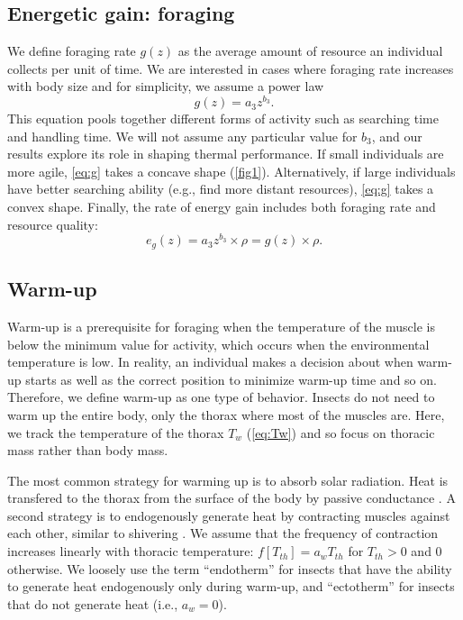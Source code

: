 \subsection*{Energetic gain: foraging}
We define foraging rate $g(z)$ as the average amount of resource an individual collects per unit of time.
We are interested in cases where foraging rate increases with body size and for simplicity, we assume a power law  %
\begin{equation} \label{eq:g}
	g(z) = a_3 z^{b_3}.
\end{equation}
This equation pools together different forms of activity such as searching time and handling time. %
We will not assume any particular value for $b_3$, and our results explore its role in shaping thermal performance.
If small individuals are more agile, \cref{eq:g} takes a concave shape (\cref{fig1}).
Alternatively, if large individuals have better searching ability (e.g., find more distant resources), \cref{eq:g} takes a convex shape.
Finally, the rate of energy gain includes both foraging rate and resource quality:
\begin{equation} \label{eq:eg}
	e_g(z) = a_3 z^{b_3} \times \rho  = g(z) \times \rho. %
\end{equation}

\subsection*{Warm-up}
Warm-up is a prerequisite for foraging when the temperature of the muscle is below the minimum value for activity, which occurs when the environmental temperature is low. 
In reality, an individual makes a decision about when warm-up starts as well as the correct position to minimize warm-up time and so on. 
Therefore, we define warm-up as one type of behavior.
Insects do not need to warm up the entire body, only the thorax where most of the muscles are. 
Here, we track the temperature of the thorax $T_w$ (\cref{eq:Tw}) and so focus on thoracic mass rather than body mass.

The most common strategy for warming up is to absorb solar radiation.
Heat is transfered to the thorax from the surface of the body by passive conductance \citep{Bakken1976}.
A second strategy is to endogenously generate heat by contracting muscles against each other, similar to shivering \citep[e.g.,][]{Kammer1974}.
We assume that the frequency of contraction increases linearly with thoracic temperature: $f[T_{th}]  = a_w T_{th}$ for $T_{th}> 0$ and 0 otherwise.
We loosely use the term ``endotherm'' for insects that have the ability to generate heat endogenously only during warm-up, and ``ectotherm'' for insects that do not generate heat (i.e., $a_w = 0$).  %

